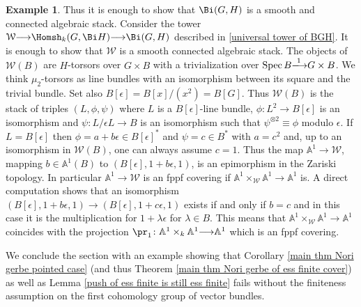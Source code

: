 \documentclass[12pt,reqno]{amsart}
\theoremstyle{plain}
\theoremstyle{definition}
\newtheorem{ex}[thm]{Example}
\numberwithin{thm}{section}
\newcounter{x}\setcounter{x}{1}
\theoremstyle{plain}
\begin{document}
\begin{ex}
  
  Thus it is enough to show that $\Bi(G,H)$ is a smooth and connected algebraic stack.   
  Consider the tower ${\mathcal{W}}{\longrightarrow} \Homsh_k(G,\Bi H){\longrightarrow} \Bi(G,H)$ described in \ref{universal tower of BGH}. It is enough to show that ${\mathcal{W}}$ is a smooth connected algebraic stack. The objects of ${\mathcal{W}}(B)$ are $H$-torsors over $G\times B$ with a trivialization over ${{\rm Spec \,}} B{\xlongrightarrow{1}} G\times B$. We think $\mu_2$-torsors as line bundles with an isomorphism between its square and the trivial bundle. Set also $B[\epsilon]=B[x]/(x^2)=B[G]$. Thus ${\mathcal{W}}(B)$ is the stack of triples $(L,\phi,\psi)$ where $L$ is a $B[\epsilon]$-line bundle, $\phi\colon L^2{\longrightarrow} B[\epsilon]$ is an isomorphism and $\psi\colon L/\epsilon L {\longrightarrow} B$ is an isomorphism such that $\psi^{\otimes 2} \equiv \phi$ modulo $\epsilon$. If $L=B[\epsilon]$ then $\phi=a+b\epsilon \in B[\epsilon]^*$ and $\psi=c\in B^*$ with $a=c^2$ and, up to an isomorphism in ${\mathcal{W}}(B)$, one can always assume $c=1$. Thus the map ${{\mathbb A}}^1{\longrightarrow} {\mathcal{W}}$, mapping $b\in {{\mathbb A}}^1(B)$ to $(B[\epsilon],1+b\epsilon,1)$, is an epimorphism in the Zariski topology. In particular ${{\mathbb A}}^1{\longrightarrow} {\mathcal{W}}$ is an fppf covering if  ${{\mathbb A}}^1 \times_{\mathcal{W}} {{\mathbb A}}^1 {\longrightarrow} {{\mathbb A}}^1$ is. A direct computation shows that an isomorphism $(B[\epsilon],1+b\epsilon,1){\longrightarrow} (B[\epsilon],1+c\epsilon,1)$ exists if and only if $b=c$ and in this case it is the multiplication for $1+\lambda\epsilon$ for $\lambda\in B$. This means that ${{\mathbb A}}^1 \times_{\mathcal{W}} {{\mathbb A}}^1 {\longrightarrow} {{\mathbb A}}^1$ coincides with the projection $\pr_1\colon{{\mathbb A}}^1\times_k {{\mathbb A}}^1{\longrightarrow} {{\mathbb A}}^1$ which is an fppf covering.
 \end{ex}

We conclude the section with an example showing that Corollary \ref{main thm Nori 
gerbe pointed case} (and thus Theorem \ref{main thm Nori gerbe of ess finite 
cover}) as well as Lemma \ref{push of ess finite is still ess finite} fails without 
the finiteness assumption on the first cohomology group of vector bundles.
\end{document}
